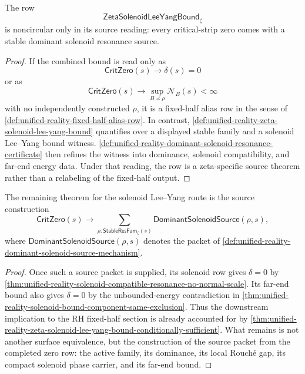 \begin{corollary}
\label{cor:unified-reality-combined-bound-source-reading}
The row
$$
\mathsf{ZetaSolenoidLeeYangBound}_{\zeta}
$$
is noncircular only in its source reading: every critical-strip zero
comes with a stable dominant solenoid resonance source.
\end{corollary}

\begin{proof}
If the combined bound is read only as
$$
\mathsf{CritZero}(s)\to\delta(s)=0
$$
or as
$$
\mathsf{CritZero}(s)\to
\sup_{B\preceq\rho}\mathcal N_B(s)<\infty
$$
with no independently constructed $\rho$, it is a fixed-half alias row in
the sense of
\autoref{def:unified-reality-fixed-half-alias-row}.  In contrast,
\autoref{def:unified-reality-zeta-solenoid-lee-yang-bound} quantifies
over a displayed stable family and a solenoid Lee--Yang bound witness.
\autoref{def:unified-reality-dominant-solenoid-resonance-certificate}
then refines the witness into dominance, solenoid compatibility, and
far-end energy data.  Under that reading, the row is a zeta-specific
source theorem rather than a relabeling of the fixed-half output.
\end{proof}

\begin{theorem}
\label{thm:unified-reality-source-gap-remaining-theorem}
The remaining theorem for the solenoid Lee--Yang route is the source
construction
$$
\mathsf{CritZero}(s)
\to
\sum_{\rho:\mathsf{StableResFam}_{\zeta}(s)}
\mathsf{DominantSolenoidSource}(\rho,s),
$$
where $\mathsf{DominantSolenoidSource}(\rho,s)$ denotes the packet of
\autoref{def:unified-reality-dominant-solenoid-source-mechanism}.
\end{theorem}

\begin{proof}
Once such a source packet is supplied, its solenoid row gives
$\delta=0$ by
\autoref{thm:unified-reality-solenoid-compatible-resonance-no-normal-scale}.
Its far-end bound also gives $\delta=0$ by the unbounded-energy
contradiction in
\autoref{thm:unified-reality-solenoid-bound-component-same-exclusion}.
Thus the downstream implication to the RH fixed-half section is already
accounted for by
\autoref{thm:unified-reality-zeta-solenoid-lee-yang-bound-conditionally-sufficient}.
What remains is not another surface equivalence, but the construction of
the source packet from the completed zero row: the active family, its
dominance, its local Rouch\'e gap, its compact solenoid phase carrier,
and its far-end bound.
\end{proof}

